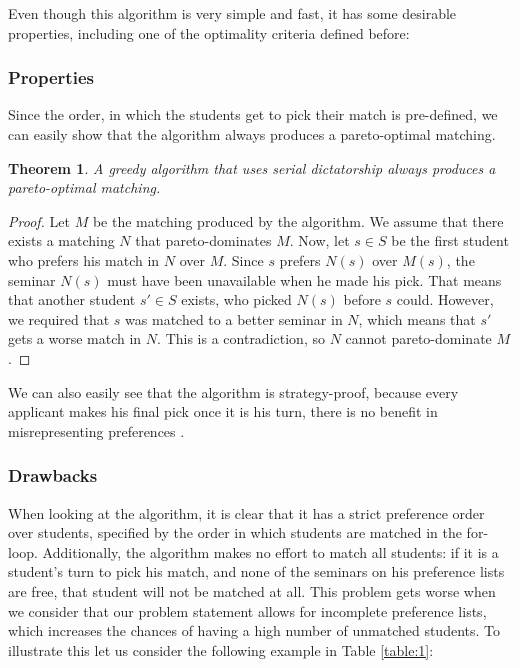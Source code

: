 Even though this algorithm is very simple and fast, it has some desirable properties, including one of the optimality criteria defined before:

\subsubsection{Properties}
Since the order, in which the students get to pick their match is pre-defined, we can easily show that the algorithm always produces a pareto-optimal matching.
\newtheorem{theorem}{Theorem}
\begin{theorem}
    A greedy algorithm that uses serial dictatorship always produces a pareto-optimal matching.
\end{theorem}
\begin{proof}
    Let $M$ be the matching produced by the algorithm. We assume that there exists a matching $N$ that pareto-dominates $M$. Now, let $s\in S$ be the first student who prefers his match in $N$ over $M$. Since $s$ prefers $N(s)$ over $M(s)$, the seminar $N(s)$ must have been unavailable when he made his pick. That means that another student $s' \in S$ exists, who picked $N(s)$ before $s$ could. However, we required that $s$ was matched to a better seminar in $N$, which means that $s'$ gets a worse match in $N$. This is a contradiction, so $N$ cannot pareto-dominate $M$ \cite{kun_2015}.
\end{proof}

We can also easily see that the algorithm is strategy-proof, because every applicant makes his final pick once it is his turn, there is no benefit in misrepresenting preferences \cite{Klaus}.

\subsubsection{Drawbacks}
When looking at the algorithm, it is clear that it has a strict preference order over students, specified by the order in which students are matched in the for-loop. Additionally, the algorithm makes no effort to match all students: if it is a student's turn to pick his match, and none of the seminars on his preference lists are free, that student will not be matched at all. This problem gets worse when we consider that our problem statement allows for incomplete preference lists, which increases the chances of having a high number of unmatched students. To illustrate this let us consider the following example in Table \ref{table:1}:

